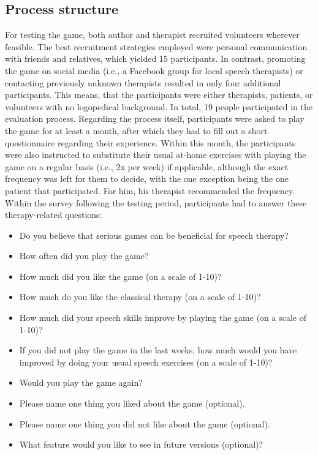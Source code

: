 \documentclass[draft,final]{vutinfth} %
\begin{document}
\subsection{Process structure}
For testing the game, both author and therapist recruited volunteers wherever feasible. The best recruitment strategies employed were personal communication with friends and relatives, which yielded 15 participants. In contrast, promoting the game on social media (i.e., a Facebook group for local speech therapists) or contacting previously unknown therapists resulted in only four additional participants. This means, that the participants  were either therapists, patients, or volunteers with no logopedical background. In total, 19 people participated in the evaluation process. Regarding the process itself, participants were asked to play the game for at least a month, after which they had to fill out a short questionnaire regarding their experience. Within this month, the participants were also instructed to substitute their usual at-home exercises with playing the game on a regular basis (i.e., 2x per week) if applicable, although the exact frequency was left for them to decide, with the one exception being the one patient that participated. For him, his therapist recommended the frequency. \\
Within the survey following the testing period, participants had to answer these therapy-related questions:
\begin{itemize}
\item Do you believe that serious games can be beneficial for speech therapy?
\item How often did you play the game?
\item How much did you like the game (on a scale of 1-10)?
\item How much do you like the classical therapy (on a scale of 1-10)?
\item How much did your speech skills improve by playing the game (on a scale of 1-10)?
\item If you did not play the game in the last weeks, how much would you have improved by doing your usual speech exercises (on a scale of 1-10)?
\item Would you play the game again?
\item Please name one thing you liked about the game (optional).
\item Please name one thing you did not like about the game (optional).
\item What feature would you like to see in future versions (optional)?
\end{itemize}
\end{document}
